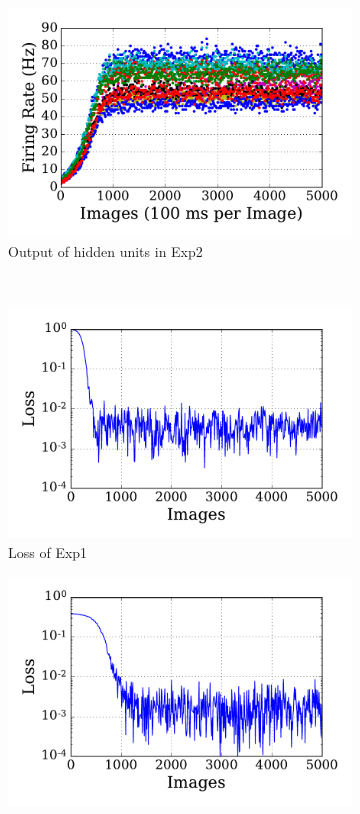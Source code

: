 \begin{figure}
\begin{subfigure}[t]{0.48\textwidth}
		\includegraphics[width=\textwidth]{pics_sdlm/17_exp_SRBM_all_long/exp2_hid_s.pdf}
		\caption{Output of hidden units in Exp2}
	\end{subfigure}\\
	\begin{subfigure}[t]{0.48\textwidth}
		\includegraphics[width=\textwidth]{pics_sdlm/17_exp_SRBM_all_long/exp1_mse_nons.pdf}
		\caption{Loss of Exp1}
	\end{subfigure}
	\begin{subfigure}[t]{0.48\textwidth}
		\includegraphics[width=\textwidth]{pics_sdlm/17_exp_SRBM_all_long/exp2_mse_nons.pdf}

\end{subfigure}
\end{figure}
